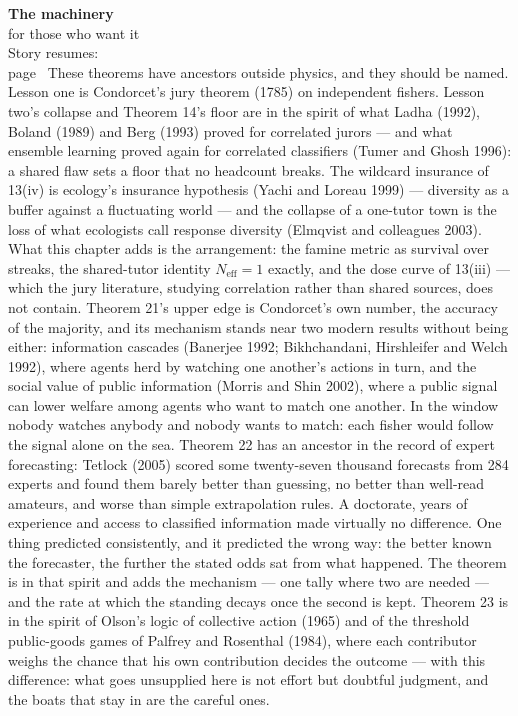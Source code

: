 \begin{machinery}{\textbf{The machinery}\\for those who want it\\[3pt]{\color{muted}Story resumes:\\page~\pageref{ch12}}}
These theorems have ancestors outside physics, and they should be named. Lesson one is Condorcet's jury theorem (1785) on independent fishers. Lesson two's collapse and Theorem 14's floor are in the spirit of what Ladha (1992), Boland (1989) and Berg (1993) proved for correlated jurors --- and what ensemble learning proved again for correlated classifiers (Tumer and Ghosh 1996): a shared flaw sets a floor that no headcount breaks. The wildcard insurance of 13(iv) is ecology's insurance hypothesis (Yachi and Loreau 1999) --- diversity as a buffer against a fluctuating world --- and the collapse of a one-tutor town is the loss of what ecologists call response diversity (Elmqvist and colleagues 2003). What this chapter adds is the arrangement: the famine metric as survival over streaks, the shared-tutor identity \(N_{\mathrm{eff}} = 1\) exactly, and the dose curve of 13(iii) --- which the jury literature, studying correlation rather than shared sources, does not contain. Theorem 21's upper edge is Condorcet's own number, the accuracy of the majority, and its mechanism stands near two modern results without being either: information cascades (Banerjee 1992; Bikhchandani, Hirshleifer and Welch 1992), where agents herd by watching one another's actions in turn, and the social value of public information (Morris and Shin 2002), where a public signal can lower welfare among agents who want to match one another. In the window nobody watches anybody and nobody wants to match: each fisher would follow the signal alone on the sea. Theorem 22 has an ancestor in the record of expert forecasting: Tetlock (2005) scored some twenty-seven thousand forecasts from 284 experts and found them barely better than guessing, no better than well-read amateurs, and worse than simple extrapolation rules. A doctorate, years of experience and access to classified information made virtually no difference. One thing predicted consistently, and it predicted the wrong way: the better known the forecaster, the further the stated odds sat from what happened. The theorem is in that spirit and adds the mechanism --- one tally where two are needed --- and the rate at which the standing decays once the second is kept. Theorem 23 is in the spirit of Olson's logic of collective action (1965) and of the threshold public-goods games of Palfrey and Rosenthal (1984), where each contributor weighs the chance that his own contribution decides the outcome --- with this difference: what goes unsupplied here is not effort but doubtful judgment, and the boats that stay in are the careful ones.


\end{machinery}
